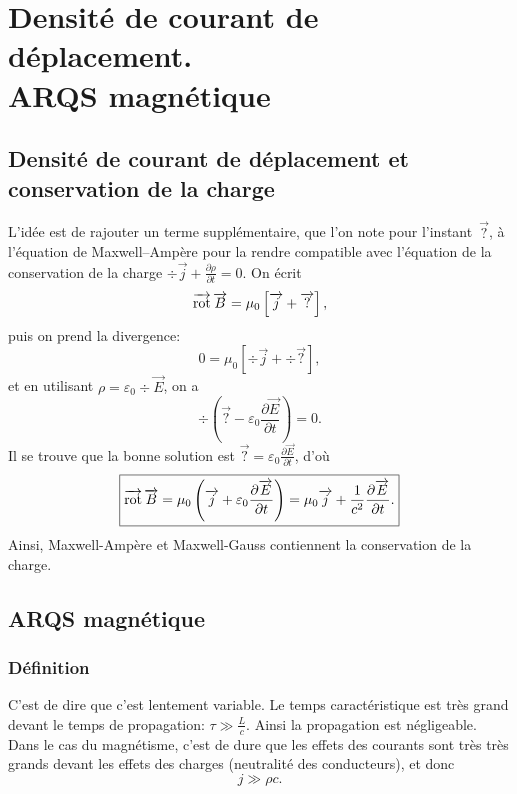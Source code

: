 \section[Densité de courant de déplacement]{Densité de courant de déplacement.\texorpdfstring{\\}{ }ARQS magnétique}
\subsection{Densité de courant de déplacement et conservation de la charge}

L'idée est de rajouter un terme supplémentaire, que l'on note pour l'instant~$\vec{?}$, à l'équation de Maxwell--Ampère pour la rendre compatible avec l'équation de la conservation de la charge $\div\vec{j}+\frac{\partial\rho}{\partial t}=0$.
On écrit 
\begin{equation*}
    \operatorname{\overrightarrow{\text{rot}}}\protect\overrightarrow{{B}}=\mu_0\left[\protect\overrightarrow{{j}}+\protect\overrightarrow{{?}}\right],
\end{equation*}
puis on prend la divergence:
\begin{equation*}
    0=\mu_0\left[\div\vec{j}+\div\vec{?}\right],
\end{equation*}
et en utilisant $\rho=\varepsilon_0\div\vec{E}$, on a 
\begin{equation*}
    \div\left(\vec{?}-\varepsilon_0\frac{\partial\vec{E}}{\partial t}\right)=0.
\end{equation*}
Il se trouve que la bonne solution est $\vec{?}=\varepsilon_0\frac{\partial\vec{E}}{\partial t}$, d'où
\begin{equation*}
    \boxed{
        \operatorname{\overrightarrow{\text{rot}}}\protect\overrightarrow{{B}}=\mu_0\left(\protect\overrightarrow{{j}}+\varepsilon_0\frac{\partial\protect\overrightarrow{{E}}}{\partial t}\right)=\mu_0\protect\overrightarrow{{j}}+\frac{1}{c^{2}}\frac{\partial\protect\overrightarrow{{E}}}{\partial t}.
    }
\end{equation*}
Ainsi, Maxwell-Ampère et Maxwell-Gauss contiennent la conservation de la charge.

\subsection{ARQS magnétique}
\subsubsection{Définition}
C'est de dire que c'est \og lentement variable\fg. Le temps caractéristique est très grand devant le temps de propagation: $\tau\gg\frac{L}{c}$. Ainsi la propagation est négligeable. Dans le cas du magnétisme, c'est de dure que les effets des courants sont très très grands devant les effets des charges (neutralité des conducteurs), et donc 
\begin{equation*}
    \boxed{
        j\gg\rho c.
    }
\end{equation*}

